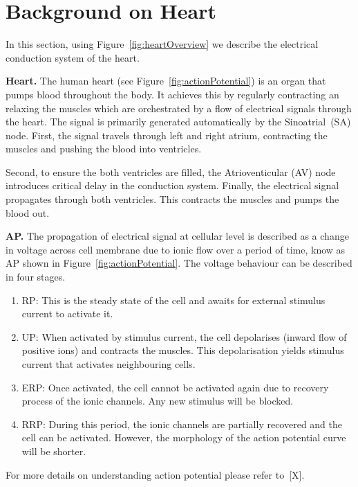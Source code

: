 \section{Background on Heart }
\begin{figure*}[htbp]
	\centering
	
	\caption{Electrical conduction systems of a heart}
	\label{fig:heartOverview}
\end{figure*}

In this section, using Figure~\ref{fig:heartOverview} we 
describe the electrical conduction system of the heart.

\noindent \textbf{Heart.}
The human heart (see Figure~\ref{fig:actionPotential})
 is an organ that pumps blood throughout the body.
It achieves this by regularly contracting an relaxing the muscles
which are orchestrated by a flow of electrical signals through the heart.
The signal is primarily generated automatically by the Sinoatrial~(SA) node.
First, the signal travels through left and right atrium, contracting 
the muscles and pushing the blood into ventricles.
 
Second, to ensure the both ventricles are filled, 
the Atrioventicular (AV) node introduces critical delay 
in the conduction system.   
Finally, the electrical signal propagates through 
both ventricles. This contracts the muscles and pumps the blood out.


	
\noindent \textbf{\acf{AP}.} 
The propagation of electrical signal at cellular level 
is described as a change in  voltage 
across cell membrane due to ionic flow over a period of time, 
know as \acf{AP} shown in Figure~\ref{fig:actionPotential}. 
The voltage behaviour can be described in four stages.
\begin{enumerate}
	\item \acf{RP}: This is the steady state of the cell and awaits for 
					external stimulus current to activate it.
	\item \acf{UP}: When activated by stimulus current, 
					the cell depolarises (inward flow of positive ions) and 
					contracts the muscles. This depolarisation yields 
					stimulus current that activates neighbouring cells.
	\item \acf{ERP}: Once activated, the cell cannot be activated again 
					 due to recovery process of the ionic channels. 
					 Any new stimulus will be blocked. 
	\item \acf{RRP}: During this period, the ionic channels are partially recovered
					 and the cell can be activated. However, the morphology
					 of the action potential curve will be shorter.
	
\end{enumerate} 
 For more details on understanding action potential please refer to~[X].

